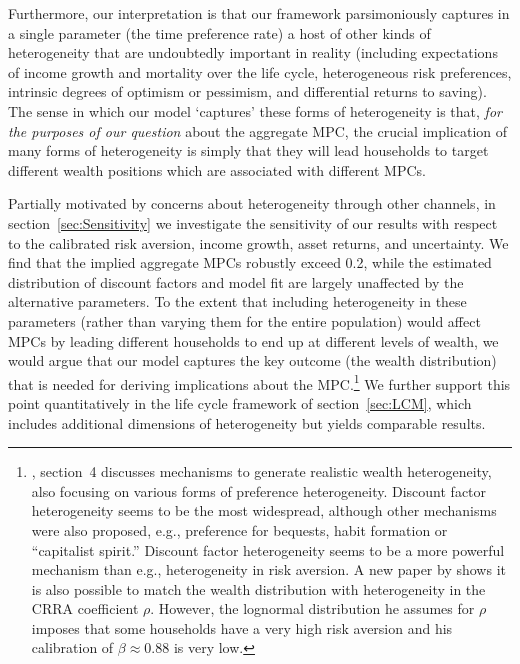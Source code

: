 \documentclass[12pt,titlepage]{econtex}
\begin{document}
Furthermore, our interpretation is that our framework parsimoniously
captures in a single parameter (the time preference rate) a host of
other kinds of heterogeneity that are undoubtedly important in
reality (including expectations of income growth and mortality over the life cycle, heterogeneous risk preferences, intrinsic degrees of optimism or pessimism,
and differential returns to saving).  The sense in which our model `captures' these forms of
heterogeneity is that, {\it for the purposes of our question} about
the aggregate MPC, the crucial implication of many forms of
heterogeneity is simply that they will lead households to target different wealth positions which are associated with different MPCs.

Partially motivated by concerns about heterogeneity through other channels, in section~\ref{sec:Sensitivity} we investigate the sensitivity of our results with respect to the
calibrated risk aversion, income growth, asset returns, and uncertainty.  We find that the implied aggregate MPCs robustly exceed 0.2, while the estimated distribution of discount factors and model fit are largely unaffected by the alternative parameters.  To the extent that including
heterogeneity in these parameters (rather than varying them for the entire population) would affect MPCs by leading different households to
end up at different levels of wealth, we would argue that our model captures
the key outcome (the wealth distribution) that is needed for deriving
implications about the MPC.\footnote{%
\cite{deNardi2015}, section~4 discusses mechanisms to generate realistic wealth heterogeneity, also focusing on various forms of preference heterogeneity.  Discount factor heterogeneity seems to be the most widespread, although other mechanisms were also proposed, e.g., preference for bequests, habit formation or ``capitalist spirit.'' Discount factor heterogeneity seems to be a more powerful mechanism than e.g., heterogeneity in risk aversion. A new paper by \cite{cozzi2012} shows it is also possible to match the wealth distribution with heterogeneity in the CRRA coefficient $\rho$. However, the lognormal distribution he assumes for $\rho$ imposes that some households have a very high risk aversion and his calibration of $\beta\approx0.88$ is very low.}  We further support this point quantitatively in the life cycle framework of section~\ref{sec:LCM}, which includes additional dimensions of heterogeneity but yields comparable results.
\end{document}
